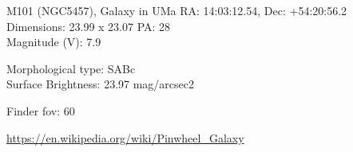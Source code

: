 \begin{block}{M101 (NGC5457), Galaxy in UMa}
    RA: 14:03:12.54, Dec: +54:20:56.2 \\ 
    Dimensions: 23.99 x 23.07 PA: 28 \\ 
    Magnitude (V): 7.9

    Morphological type: SABc \\ 
    Surface Brightness: 23.97 mag/arcsec2 


    Finder fov: 60 

    \url{https://en.wikipedia.org/wiki/Pinwheel_Galaxy} 
\end{block}